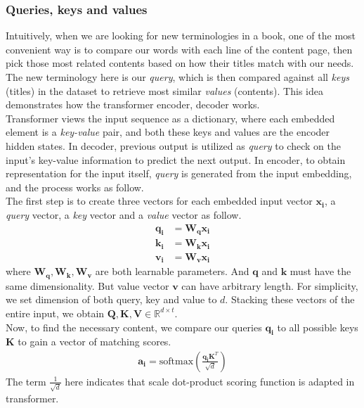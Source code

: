 \subsubsection{Queries, keys and values}
Intuitively, when we are looking for new terminologies in a book, one of the most convenient way is to compare our words with each line of the content page, then pick those most related contents based on how their titles match with our needs. The new terminology here is our \textit{query}, which is then compared against all \textit{keys} (titles) in the dataset to retrieve most similar \textit{values} (contents).
This idea demonstrates how the transformer encoder, decoder works.\\
Transformer views the input sequence as a dictionary, where each embedded element is a \textit{key-value} pair, and both these keys and values are the encoder hidden states.
In decoder, previous output is utilized as \textit{query} to check on the input's key-value information to predict the next output. In encoder, to obtain representation for the input itself, \textit{query} is generated from the input embedding, and the process works as follow. \\
The first step is to create three vectors for each embedded input vector $\mathbf{x_i}$, a \textit{query} vector, a \textit{key} vector and a \textit{value} vector as follow.
\begin{align*}
    \mathbf{q_i} &= \mathbf{W_q}\mathbf{x_i} \\
    \mathbf{k_i} &= \mathbf{W_k}\mathbf{x_i} \\
    \mathbf{v_i} &= \mathbf{W_v}\mathbf{x_i}
\end{align*}
where $\mathbf{W_q}, \mathbf{W_k}, \mathbf{W_v}$ are both learnable parameters. And $\mathbf{q}$ and $\mathbf{k}$ must have the same dimensionality. But value vector $\mathbf{v}$ can have arbitrary length. For simplicity, we set dimension of both query, key and value to $d$. Stacking these vectors of the entire input, we obtain $\mathbf{Q}, \mathbf{K}, \mathbf{V} \in \mathbb{R}^{d \times t}$. \\
Now, to find the necessary content, we compare our queries $\mathbf{q_i}$ to all possible keys $\mathbf{K}$ to gain a vector of matching scores.
\begin{align}
    \mathbf{a_i} = \mathrm{softmax}(\frac{\mathbf{q_i}\mathbf{K}^T}{\sqrt{d}})
\end{align}
The term $\frac{1}{\sqrt{d}}$ here indicates that scale dot-product scoring function is adapted in transformer. 
